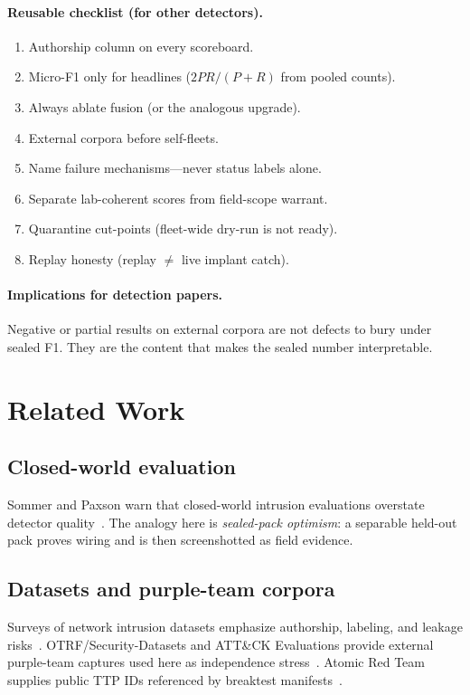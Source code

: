 \documentclass[conference,compsoc]{IEEEtran}
\begin{document}
\paragraph{Reusable checklist (for other detectors).}
\begin{enumerate}
\item Authorship column on every scoreboard.
\item Micro-F1 only for headlines ($2PR/(P{+}R)$ from pooled counts).
\item Always ablate fusion (or the analogous upgrade).
\item External corpora before self-fleets.
\item Name failure mechanisms---never status labels alone.
\item Separate lab-coherent scores from field-scope warrant.
\item Quarantine cut-points (fleet-wide dry-run is not ready).
\item Replay honesty (replay $\neq$ live implant catch).
\end{enumerate}

\paragraph{Implications for detection papers.}
Negative or partial results on external corpora are not defects to bury under
sealed F1.
They are the content that makes the sealed number interpretable.

\section{Related Work}
\label{sec:related}

\subsection{Closed-world evaluation}
Sommer and Paxson warn that closed-world intrusion evaluations overstate
detector quality~\cite{sommer_paxson_2010}.
The analogy here is \emph{sealed-pack optimism}: a separable held-out pack
proves wiring and is then screenshotted as field evidence.

\subsection{Datasets and purple-team corpora}
Surveys of network intrusion datasets emphasize authorship, labeling, and
leakage risks~\cite{ring_2019_survey}.
OTRF/Security-Datasets and ATT\&CK Evaluations provide external purple-team
captures used here as independence stress~\cite{otrf_mordor,attack_evals,caldera}.
Atomic Red Team supplies public TTP IDs referenced by breaktest
manifests~\cite{atomic_red_team}.
\end{document}
